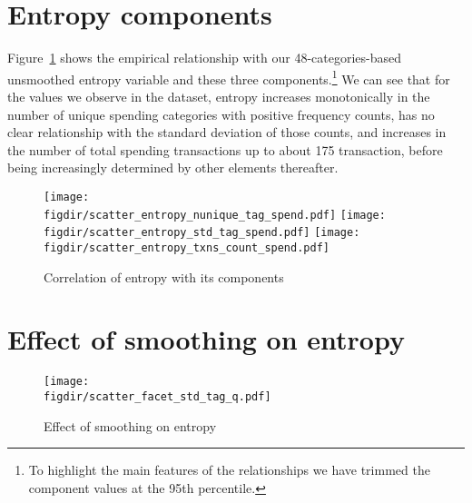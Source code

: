 \section{Entropy components}%
\label{sec:entropy_components}

Figure~\ref{fig:entropy_components} shows the empirical relationship with our
48-categories-based unsmoothed entropy variable and these three
components.\footnote{To highlight the main features of the relationships we
have trimmed the component values at the 95th percentile.} We can see that for
the values we observe in the dataset, entropy increases monotonically in the
number of unique spending categories with positive frequency counts, has no
clear relationship with the standard deviation of those counts, and increases
in the number of total spending transactions up to about 175 transaction,
before being increasingly determined by other elements thereafter.

\begin{figure}[ht]
    \centering 
    \caption{Correlation of entropy with its components}
    \label{fig:entropy_components}
    \texttt{[image: \\figdir/scatter\_entropy\_nunique\_tag\_spend.pdf]}
    \texttt{[image: \\figdir/scatter\_entropy\_std\_tag\_spend.pdf]}
    \texttt{[image: \\figdir/scatter\_entropy\_txns\_count\_spend.pdf]}
\end{figure}


\section{Effect of smoothing on entropy}%
\label{sec:effect_of_smothing_on_entropy}

\begin{figure}[ht]
    \centering 
    \caption{Effect of smoothing on entropy}
    \label{fig:scatter_facets_txns_count_spend_q}
    \texttt{[image: \\figdir/scatter\_facet\_std\_tag\_q.pdf]}
\end{figure}

